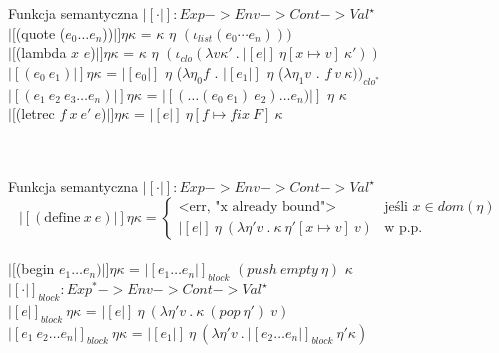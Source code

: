 \documentclass[12pt,serif]{beamer}
\begin{document}
\begin{frame}{Funkcja semantyczna}
$|[ \cdot |]: Exp -> Env -> Cont -> Val^{\star}$ \newline
\\
$|[$(quote ($e_0 \ldots e_n$))$|] \eta \kappa$ =
  $\kappa$ $\eta$ $(\iota_{list} (e_0 \cdots e_n)))$ \newline
\\
$|[$(lambda $x$ $e$)$|] \eta \kappa$ =
  $\kappa$ $\eta$ $(\iota_{clo} (\lambda v \kappa'~.~ |[e|]~\eta[x \mapsto v]~\kappa' ))$ \newline
\\
$|[(e_0~e_1)|] \eta \kappa$ =
  $|[e_0|]$ $\eta$ ($\lambda \eta_0 f$ .
  $|[e_1|]$ $\eta$ ($\lambda \eta_1 v$ . $f~v~\kappa))_{clo^{*}}$ \newline
\\
$|[(e_1~e_2~e_3 \ldots e_n)|] \eta \kappa$ =
  $|[ (\ldots(e_0~e_1)~e_2) \ldots e_n) |]$ $\eta$ $\kappa$ \newline
\\
$|[$(letrec $f~x~e'~e$)$|] \eta \kappa$ = $|[e|]~\eta[f \mapsto fix~F]~\kappa$ \\
\hspace{1em}{gdzie:} \\
 \\
\end{frame}

\begin{frame}{Funkcja semantyczna}
$|[ \cdot |]: Exp -> Env -> Cont -> Val^{\star}$ \newline
\\
\[
 |[(\text{define}~x~e)|] \eta \kappa =
  \begin{cases}
   \text{<err, "x already bound">} & \text{jeśli } x \in dom(\eta) \\
   |[e|] ~ \eta ~ (\lambda \eta' v ~. ~ \kappa ~ \eta'[x \mapsto v] ~ v) & \text{w p.p.}
  \end{cases}
\] \newline
\\
$|[$(begin $e_1 \ldots e_n)|] \eta \kappa$ =
  $|[e_1 \ldots e_n|]_{block}$ $(push~empty~\eta)$ $\kappa$ \newline
\\
$|[ \cdot |]_{block}: Exp^{*} -> Env -> Cont -> Val^{\star}$ \newline
\\
$|[ e |]_{block} ~\eta \kappa$ =
  $|[ e |] ~ \eta ~ (\lambda \eta' v ~ . ~ \kappa ~ (pop~\eta') ~ v)$ \\
$|[ e_1 ~ e_2 \ldots e_n |]_{block} ~\eta \kappa$ =
  $|[ e_1 |] ~ \eta ~ (\lambda \eta' v ~ . ~ |[ e_2 \ldots e_n |]_{block} ~ \eta' \kappa )$ \\
\end{frame}
\end{document}
